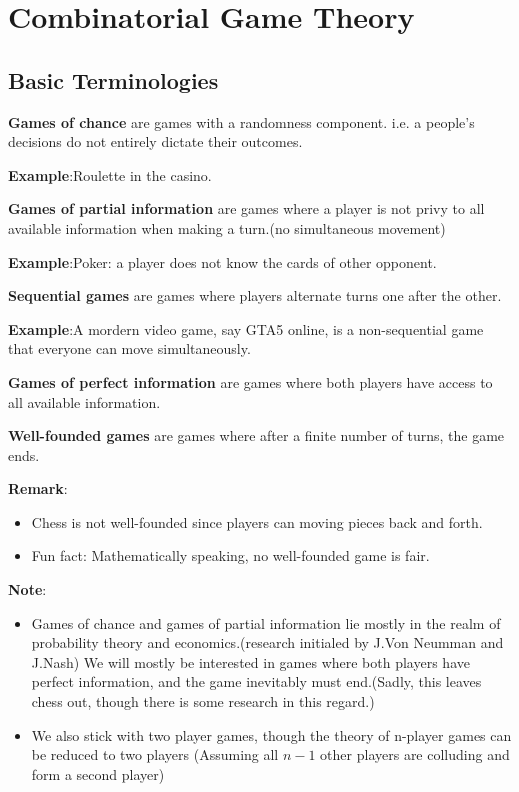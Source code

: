 \chapter{Combinatorial Game Theory}


\section{Basic Terminologies}

\begin{definition}
    \textbf{Games of chance} are games with a randomness component. i.e. a people's decisions do not entirely dictate their outcomes.
\end{definition}
\textbf{Example}:Roulette in the casino.


\begin{definition}
    \textbf{Games of partial information} are games where a player is not privy to all available information when making a turn.(no simultaneous movement)
\end{definition}
\textbf{Example}:Poker: a player does not know the cards of other opponent.


\begin{definition}
    \textbf{Sequential games} are games where players alternate turns one after the other.
\end{definition}
\textbf{Example}:A mordern video game, say GTA5 online, is a non-sequential game that everyone can move simultaneously.


\begin{definition}
    \textbf{Games of perfect information} are games where both players have access to all available information.
\end{definition}


\begin{definition}
    \textbf{Well-founded games} are games where after a finite number of turns, the game ends.
\end{definition}
\textbf{Remark}:
\begin{itemize}
    \item Chess is not well-founded since players can moving pieces back and forth.
    \item Fun fact: Mathematically speaking, no well-founded game is fair.
\end{itemize}

\noindent \textbf{Note}:
\begin{itemize}
    \item Games of chance and games of partial information lie mostly in the realm of probability theory and economics.(research initialed by J.Von Neumman and J.Nash) 
    We will mostly be interested in games where both players have perfect information, and the game inevitably must end.(Sadly, this leaves chess out, though there is some research in this regard.)
    \item We also stick with two player games, though the theory of n-player games can be reduced to two players (Assuming all $n-1$ other players are colluding and form a second player)
\end{itemize}


